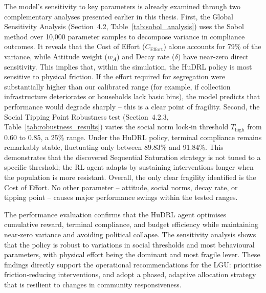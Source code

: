 The model’s sensitivity to key parameters is already examined through two complementary analyses presented earlier in this thesis. First, the Global Sensitivity Analysis (Section~4.2, Table~\ref{tab:sobol_analysis}) uses the Sobol method over 10,000 parameter samples to decompose variance in compliance outcomes. It reveals that the Cost of Effort ($C_{\text{Effort}}$) alone accounts for 79\% of the variance, while Attitude weight ($w_A$) and Decay rate ($\delta$) have near‑zero direct sensitivity. This implies that, within the simulation, the HuDRL policy is most sensitive to physical friction. If the effort required for segregation were substantially higher than our calibrated range (for example, if collection infrastructure deteriorates or households lack basic bins), the model predicts that performance would degrade sharply – this is a clear point of fragility. Second, the Social Tipping Point Robustness test (Section~4.2.3, Table~\ref{tab:robustness_results}) varies the social norm lock‑in threshold $T_{\text{high}}$ from 0.60 to 0.85, a 25\% range. Under the HuDRL policy, terminal compliance remains remarkably stable, fluctuating only between 89.83\% and 91.84\%. This demonstrates that the discovered Sequential Saturation strategy is not tuned to a specific threshold; the RL agent adapts by sustaining interventions longer when the population is more resistant. Overall, the only clear fragility identified is the Cost of Effort. No other parameter – attitude, social norms, decay rate, or tipping point – causes major performance swings within the tested ranges.

The performance evaluation confirms that the HuDRL agent optimises cumulative reward, terminal compliance, and budget efficiency while maintaining near‑zero variance and avoiding political collapse. The sensitivity analysis shows that the policy is robust to variations in social thresholds and most behavioural parameters, with physical effort being the dominant and most fragile lever. These findings directly support the operational recommendations for the LGU: prioritise friction‑reducing interventions, and adopt a phased, adaptive allocation strategy that is resilient to changes in community responsiveness.

